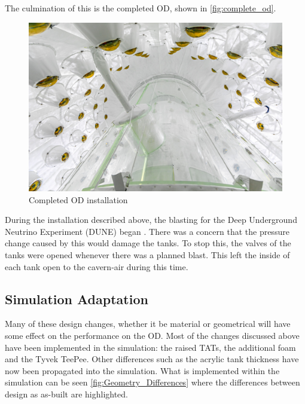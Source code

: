 \par
The culmination of this is the completed OD, shown in \autoref{fig:complete_od}.

\begin{figure}[!tbph]
\includegraphics[width=\textwidth]{Figures/Construction/od_complete.jpg}
\centering
\caption{Completed OD installation}
\label{fig:complete_od}
\end{figure}

\par
During the installation described above, the blasting for the Deep Underground Neutrino Experiment (DUNE) began \cite{dune_blasting_ref}.
There was a concern that the pressure change caused by this would damage the tanks.
To stop this, the valves of the tanks were opened whenever there was a planned blast.
This left the inside of each tank open to the cavern-air during this time.

\subsection{Simulation Adaptation}
\par
Many of these design changes, whether it be material or geometrical will have some effect on the performance on the OD.
Most of the changes discussed above have been implemented in the simulation: the raised TATs, the additional foam and the Tyvek TeePee.
Other differences such as the acrylic tank thickness have now been propagated into the simulation.
What is implemented within the simulation can be seen \autoref{fig:Geometry_Differences} where the differences between design as as-built are highlighted.



